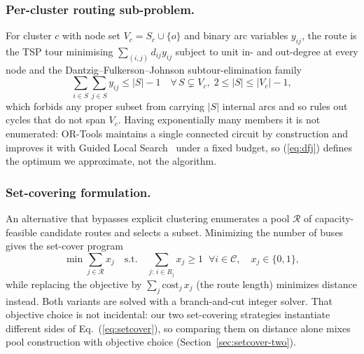 \documentclass[graybox]{SNmult}
\begin{document}
\subsubsection{Per-cluster routing sub-problem.}
For cluster $c$ with node set $V_c=S_c\cup\{o\}$ and binary arc variables
$y_{ij}$, the route is the TSP tour minimising
$\sum_{(i,j)} d_{ij}y_{ij}$ subject to unit in- and out-degree at every
node and the Dantzig--Fulkerson--Johnson subtour-elimination family
\begin{equation}
\textstyle\sum_{i\in S}\sum_{j\in S} y_{ij}\le |S|-1
  \quad \forall\, S\subsetneq V_c,\; 2\le|S|\le|V_c|-1,
  \label{eq:dfj}
\end{equation}
which forbids any proper subset from carrying $|S|$ internal arcs and so
rules out cycles that do not span $V_c$. Having exponentially many
members it is not enumerated: OR-Tools maintains a single connected
circuit by construction and improves it with Guided Local
Search~\cite{Voudouris1999GLS} under a fixed budget, so
(\ref{eq:dfj}) defines the optimum we approximate, not the algorithm.

\subsubsection{Set-covering formulation.}\label{sec:setcover-formulation}
An alternative that bypasses explicit clustering enumerates a pool
$\mathcal{R}$ of capacity-feasible candidate routes and selects a
subset. Minimizing the number of buses gives the set-cover program
\begin{equation}
\min \sum_{j\in\mathcal{R}} x_j \quad\text{s.t.}\quad
\sum_{j:\,i\in R_j} x_j \ge 1\;\;\forall i\in\mathcal{C},\quad
x_j\in\{0,1\},
\label{eq:setcover}
\end{equation}
while replacing the objective by $\sum_j \mathrm{cost}_j\,x_j$ (the
route length) minimizes distance instead. Both variants are solved
with a branch-and-cut integer solver. That objective choice is not
incidental: our two set-covering strategies instantiate different sides of
Eq.~(\ref{eq:setcover}), so comparing them on distance alone mixes pool
construction with objective choice (Section~\ref{sec:setcover-two}).
\end{document}

